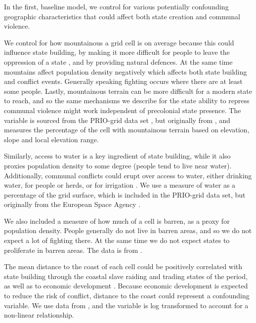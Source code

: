 In the first, baseline model, we control for various potentially confounding
geographic characteristics that could affect both state creation and communal
violence. 

We control for how mountainous a grid cell is on average because this could
influence state building, by making it more difficult for people to leave the
oppression of a state \citep{Carneiro1988, scott2017against}, and by providing
natural defences. At the same time mountains affect population density
negatively which affects both state building and conflict events. Generally
speaking fighting occurs where there are at least some people. Lastly,
mountainous terrain can be more difficult for a modern state to reach, and so
the same mechanisms we describe for the state ability to repress communal
violence might work independent of precolonial state presence. The variable is
sourced from the PRIO-grid data set \citep{Tollefsen2012}, but originally from
\citet{Blyth2002}, and measures the percentage of the cell with mountainous
terrain based on elevation, slope and local elevation range.


Similarly, access to water is a key ingredient of state building, while it also
proxies population density to some degree (people tend to live near water).
Additionally, communal conflicts could erupt over access to water, either
drinking water, for people or herds, or for irrigation \citep{Doring2020, Detges_2014}.
We use a measure of water as a percentage of the grid surface, which is included
in the PRIO-grid data set, but originally from the European Space Agency
\citep{Bontemps2009}.

We also included a measure of how much of a cell is barren, as a proxy for
population density. People generally do not live in barren areas, and so we do
not expect a lot of fighting there. At the same time we do not expect states to
proliferate in barren areas. The data is from \citet{Bontemps2009}.

The mean distance to the coast of each cell could be positively correlated with
state building through the coastal slave raiding and trading states of the
period, as well as to economic development \citep{Nunn2008}. Because economic
development is expected to reduce the risk of conflict, distance to the coast
could represent a confounding variable. We use data from \citet{Wessel1996}, and
the variable is log transformed to account for a non-linear relationship.


